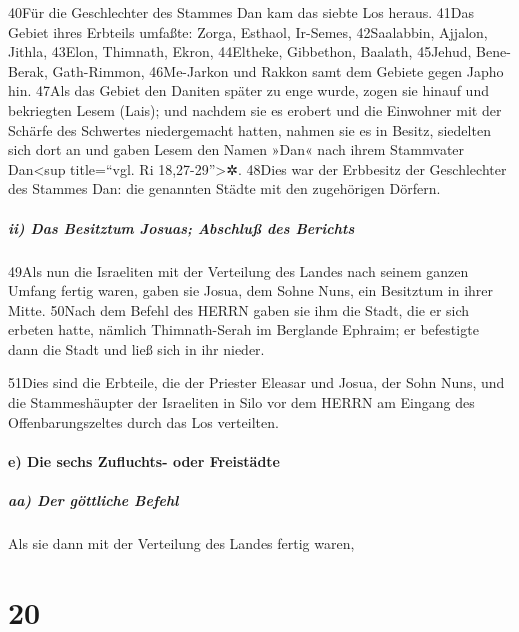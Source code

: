 40Für die Geschlechter des Stammes Dan kam das siebte Los heraus. 41Das
Gebiet ihres Erbteils umfaßte: Zorga, Esthaol, Ir-Semes, 42Saalabbin,
Ajjalon, Jithla, 43Elon, Thimnath, Ekron, 44Eltheke, Gibbethon, Baalath,
45Jehud, Bene-Berak, Gath-Rimmon, 46Me-Jarkon und Rakkon samt dem
Gebiete gegen Japho hin. 47Als das Gebiet den Daniten später zu enge
wurde, zogen sie hinauf und bekriegten Lesem (Lais); und nachdem sie es
erobert und die Einwohner mit der Schärfe des Schwertes niedergemacht
hatten, nahmen sie es in Besitz, siedelten sich dort an und gaben Lesem
den Namen »Dan« nach ihrem Stammvater Dan\textless sup title=``vgl. Ri
18,27-29''\textgreater✲. 48Dies war der Erbbesitz der Geschlechter des
Stammes Dan: die genannten Städte mit den zugehörigen Dörfern.

\hypertarget{ii-das-besitztum-josuas-abschluuxdf-des-berichts}{%
\subparagraph{ii) Das Besitztum Josuas; Abschluß des
Berichts}\label{ii-das-besitztum-josuas-abschluuxdf-des-berichts}}

49Als nun die Israeliten mit der Verteilung des Landes nach seinem
ganzen Umfang fertig waren, gaben sie Josua, dem Sohne Nuns, ein
Besitztum in ihrer Mitte. 50Nach dem Befehl des HERRN gaben sie ihm die
Stadt, die er sich erbeten hatte, nämlich Thimnath-Serah im Berglande
Ephraim; er befestigte dann die Stadt und ließ sich in ihr nieder.

51Dies sind die Erbteile, die der Priester Eleasar und Josua, der Sohn
Nuns, und die Stammeshäupter der Israeliten in Silo vor dem HERRN am
Eingang des Offenbarungszeltes durch das Los verteilten.

\hypertarget{e-die-sechs-zufluchts--oder-freistuxe4dte}{%
\paragraph{e) Die sechs Zufluchts- oder
Freistädte}\label{e-die-sechs-zufluchts--oder-freistuxe4dte}}

\hypertarget{aa-der-guxf6ttliche-befehl}{%
\subparagraph{aa) Der göttliche
Befehl}\label{aa-der-guxf6ttliche-befehl}}

Als sie dann mit der Verteilung des Landes fertig waren,

\hypertarget{section-19}{%
\section{20}\label{section-19}}

